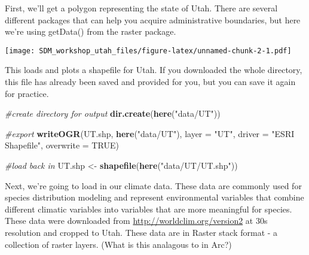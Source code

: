 \documentclass[]{article}
\newenvironment{Shaded}{\begin{snugshade}}{\end{snugshade}}
\newcommand{\KeywordTok}[1]{\textcolor[rgb]{0.13,0.29,0.53}{\textbf{#1}}}
\newcommand{\DataTypeTok}[1]{\textcolor[rgb]{0.13,0.29,0.53}{#1}}
\newcommand{\DecValTok}[1]{\textcolor[rgb]{0.00,0.00,0.81}{#1}}
\newcommand{\StringTok}[1]{\textcolor[rgb]{0.31,0.60,0.02}{#1}}
\newcommand{\CommentTok}[1]{\textcolor[rgb]{0.56,0.35,0.01}{\textit{#1}}}
\newcommand{\OtherTok}[1]{\textcolor[rgb]{0.56,0.35,0.01}{#1}}
\newcommand{\OperatorTok}[1]{\textcolor[rgb]{0.81,0.36,0.00}{\textbf{#1}}}
\newcommand{\NormalTok}[1]{#1}
\begin{document}
First, we'll get a polygon representing the state of Utah. There are
several different packages that can help you acquire administrative
boundaries, but here we're using getData() from the raster package.

\begin{Shaded}
\end{Shaded}

\texttt{[image: SDM\_workshop\_utah\_files/figure-latex/unnamed-chunk-2-1.pdf]}

This loads and plots a shapefile for Utah. If you downloaded the whole
directory, this file has already been saved and provided for you, but
you can save it again for practice.

\begin{Shaded}
\begin{Highlighting}[]
\CommentTok{#create directory for output}
\KeywordTok{dir.create}\NormalTok{(}\KeywordTok{here}\NormalTok{(}\StringTok{"data/UT"}\NormalTok{))}

\CommentTok{#export}
\KeywordTok{writeOGR}\NormalTok{(UT.shp, }\KeywordTok{here}\NormalTok{(}\StringTok{"data/UT"}\NormalTok{), }\DataTypeTok{layer =} \StringTok{"UT"}\NormalTok{, }\DataTypeTok{driver =} \StringTok{"ESRI Shapefile"}\NormalTok{, }\DataTypeTok{overwrite =} \OtherTok{TRUE}\NormalTok{)}

\CommentTok{#load back in }
\NormalTok{UT.shp <-}\StringTok{ }\KeywordTok{shapefile}\NormalTok{(}\KeywordTok{here}\NormalTok{(}\StringTok{"data/UT/UT.shp"}\NormalTok{))}
\end{Highlighting}
\end{Shaded}

Next, we're going to load in our climate data. These data are commonly
used for species distribution modeling and represent environmental
variables that combine different climatic variables into variables that
are more meaningful for species. These data were downloaded from
\url{http://worldclim.org/version2} at 30s resolution and cropped to
Utah. These data are in Raster stack format - a collection of raster
layers. (What is this analagous to in Arc?)
\end{document}
